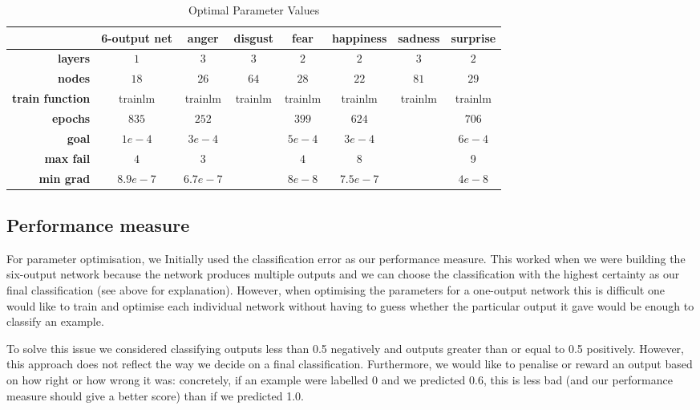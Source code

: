 \documentclass[10pt,a4paper]{article}
\begin{document}
\begin{table}
\begin{tabular}{|r|c||c|c|c|c|c|c|}
\hline 
 & \textbf{6-output net} & \textbf{anger} & \textbf{disgust} & \textbf{fear} & \textbf{happiness} & \textbf{sadness} & \textbf{surprise} \\ 
\hline 
\textbf{layers} & $1$ & $3$ & $3$ & $2$ & $2$ & $3$ & $2$ \\ 
\hline 
\textbf{nodes} & $18$ & $26$ & $64$ & $28$ & $22$ & $81$ & $29$ \\ 
\hline 
\textbf{train function} & trainlm & trainlm & trainlm & trainlm & trainlm & trainlm & trainlm \\ 
\hline 
\textbf{epochs} & $835$ & $252$ &  & $399$ & $624$ &  & $706$ \\ 
\hline 
\textbf{goal} & $1e-4$ & $3e-4$ &  & $5e-4$ & $3e-4$ &  & $6e-4$ \\ 
\hline 
\textbf{max fail} & $4$ & $3$ &  & $4$ & $8$ &  & 9 \\ 
\hline 
\textbf{min grad} & $8.9e-7$ & $6.7e-7$ &  & $8e-8$ & $7.5e-7$ & & $4e-8$ \\ 
\hline 
\end{tabular} 
\caption{Optimal Parameter Values}
\label{tab:optimalValues}
\end{table}

\subsection{Performance measure}
For parameter optimisation, we Initially used the classification error as our performance measure. This worked when we were building the six-output network because the network produces multiple outputs and we can choose the classification with the highest certainty as our final classification (see above for explanation). However, when optimising the parameters for a one-output network this is difficult one would like to train and optimise each individual network without having to guess whether the particular output it gave would be enough to classify an example. 

To solve this issue we considered classifying outputs less than 0.5 negatively and outputs greater than or equal to 0.5 positively. However, this approach does not reflect the way we decide on a final classification. Furthermore, we would like to penalise or reward an output based on how right or how wrong it was: concretely, if an example were labelled 0 and we predicted 0.6, this is less bad (and our performance measure should give a better score) than if we predicted 1.0. 
\end{document}
